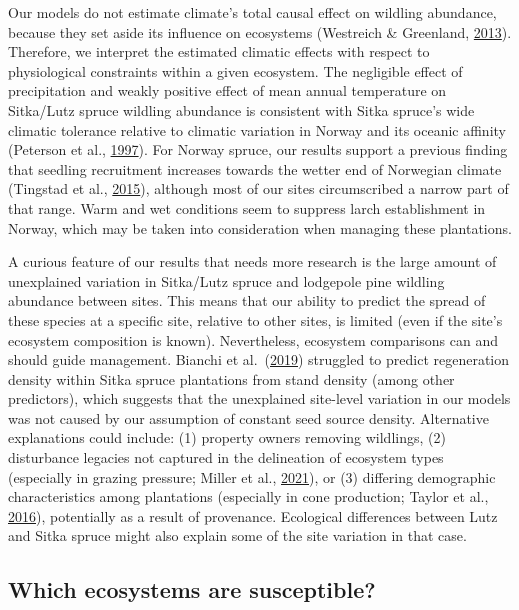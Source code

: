 \documentclass[
]{article}
\begin{document}
Our models do not estimate climate's total causal effect on wildling abundance, because they set aside its influence on ecosystems (Westreich \& Greenland, \protect\hyperlink{ref-westreichTableFallacyPresenting2013}{2013}).
Therefore, we interpret the estimated climatic effects with respect to physiological constraints within a given ecosystem.
The negligible effect of precipitation and weakly positive effect of mean annual temperature on Sitka/Lutz spruce wildling abundance is consistent with Sitka spruce's wide climatic tolerance relative to climatic variation in Norway and its oceanic affinity (Peterson et al., \protect\hyperlink{ref-petersonEcologyManagementSitka1997}{1997}).
For Norway spruce, our results support a previous finding that seedling recruitment increases towards the wetter end of Norwegian climate (Tingstad et al., \protect\hyperlink{ref-tingstadTemperaturePrecipitationBiotic2015}{2015}), although most of our sites circumscribed a narrow part of that range.
Warm and wet conditions seem to suppress larch establishment in Norway, which may be taken into consideration when managing these plantations.

A curious feature of our results that needs more research is the large amount of unexplained variation in Sitka/Lutz spruce and lodgepole pine wildling abundance between sites.
This means that our ability to predict the spread of these species at a specific site, relative to other sites, is limited (even if the site's ecosystem composition is known).
Nevertheless, ecosystem comparisons can and should guide management.
Bianchi et al.~(\protect\hyperlink{ref-bianchiMethodsPredictingSitka2019}{2019}) struggled to predict regeneration density within Sitka spruce plantations from stand density (among other predictors), which suggests that the unexplained site-level variation in our models was not caused by our assumption of constant seed source density.
Alternative explanations could include: (1) property owners removing wildlings, (2) disturbance legacies not captured in the delineation of ecosystem types (especially in grazing pressure; Miller et al., \protect\hyperlink{ref-millerHowDisturbanceHistory2021}{2021}), or (3) differing demographic characteristics among plantations (especially in cone production; Taylor et al., \protect\hyperlink{ref-taylorDriversPlantInvasion2016}{2016}), potentially as a result of provenance.
Ecological differences between Lutz and Sitka spruce might also explain some of the site variation in that case.

\hypertarget{which-ecosystems-are-susceptible}{%
\subsection{Which ecosystems are susceptible?}\label{which-ecosystems-are-susceptible}}
\end{document}
